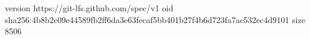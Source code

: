 version https://git-lfs.github.com/spec/v1
oid sha256:4b8b2c09e44589fb2ff6da3e63fecaf5bb401b27f4b6d723fa7ac532ec4d9101
size 8506
